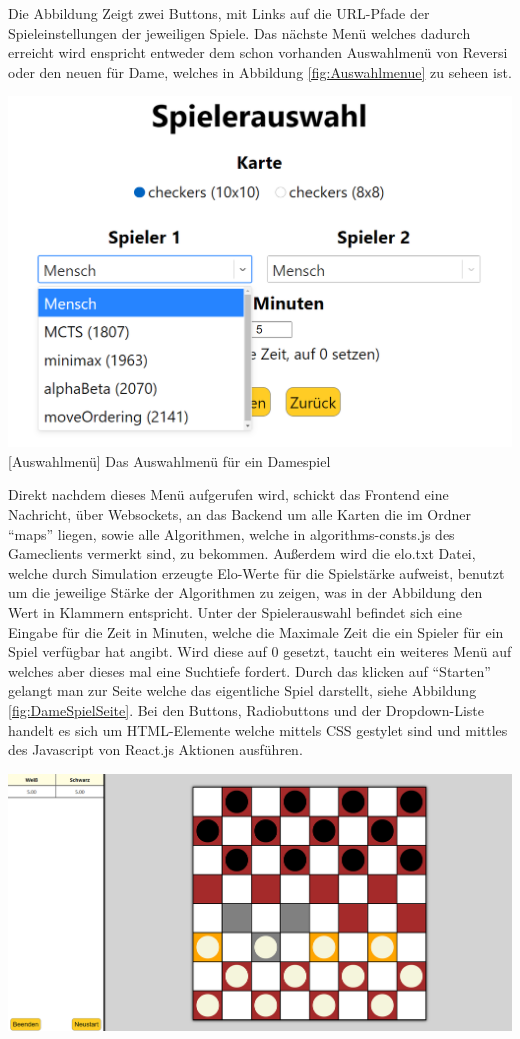 \documentclass[12pt,a4paper,bibliography=totocnumbered,listof=totocnumbered]{article}
\begin{document}
Die Abbildung Zeigt zwei Buttons, mit Links auf die URL-Pfade der Spieleinstellungen der jeweiligen Spiele. Das nächste Menü welches dadurch erreicht wird 
enspricht entweder dem schon vorhanden Auswahlmenü von Reversi oder den neuen für Dame, welches in Abbildung \ref{fig:Auswahlmenue} zu seheen ist.

\vspace{1em}
\begin{minipage}{\linewidth}
	\centering
	\includegraphics[width=0.7\linewidth]{pics/AlgorithmeninderApplikation.png}
	[Auswahlmenü]{ Das Auswahlmenü für ein Damespiel }
	\label{fig:Auswahlmenue}
\end{minipage}

Direkt nachdem dieses Menü aufgerufen wird, schickt das Frontend eine Nachricht, über Websockets, an das Backend um alle Karten die im Ordner ``maps'' liegen, sowie 
alle Algorithmen, welche in algorithms-consts.js des Gameclients vermerkt sind, zu bekommen. Außerdem wird die elo.txt Datei, welche durch 
Simulation erzeugte Elo-Werte für die Spielstärke aufweist, benutzt um die jeweilige Stärke der Algorithmen zu zeigen, was in der Abbildung 
den Wert in Klammern entspricht. Unter der Spielerauswahl befindet sich eine Eingabe für die Zeit in Minuten, welche die Maximale Zeit 
die ein Spieler für ein Spiel verfügbar hat angibt. Wird diese auf 0 gesetzt, taucht ein weiteres Menü auf welches aber dieses mal eine 
Suchtiefe fordert. Durch das klicken auf ``Starten'' gelangt man zur Seite welche das eigentliche Spiel darstellt, siehe Abbildung \ref{fig:DameSpielSeite}.
Bei den Buttons, Radiobuttons und der Dropdown-Liste handelt es sich um HTML-Elemente welche mittels CSS gestylet sind und mittles 
des Javascript von React.js Aktionen ausführen.

\vspace{1em}
\begin{minipage}{\linewidth}
	\centering
	\includegraphics[width=0.7\linewidth]{pics/DameWebsiteSpiel.png}
	\label{fig:DameSpielSeite}
\end{minipage}
\end{document}
